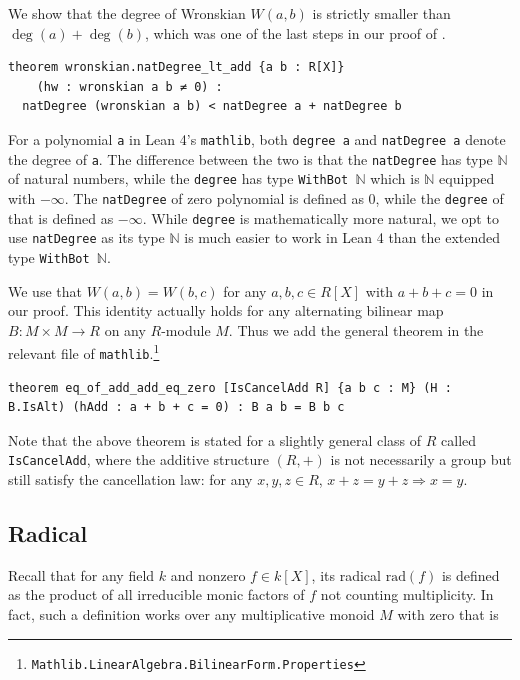 \documentclass[runningheads]{llncs}
\newcommand{\rad}{\mathrm{rad}}
\begin{document}
We show that the degree of Wronskian $W(a, b)$ is strictly smaller than $\deg(a) + \deg(b)$, which was one of the last steps in our proof of .

\begin{verbatim}
theorem wronskian.natDegree_lt_add {a b : R[X]}
    (hw : wronskian a b ≠ 0) :
  natDegree (wronskian a b) < natDegree a + natDegree b
\end{verbatim}


For a polynomial \texttt{a} in Lean 4's \texttt{mathlib}, both \texttt{degree a} and \texttt{natDegree a} denote the degree of \texttt{a}.
The difference between the two is that the \texttt{natDegree} has type $\mathbb{N}$ of natural numbers, while the \texttt{degree} has type \texttt{WithBot $\mathbb{N}$} which is $\mathbb{N}$ equipped with $-\infty$.
The \texttt{natDegree} of zero polynomial is defined as 0, while the \texttt{degree} of that is defined as $-\infty$.
While \texttt{degree} is mathematically more natural, we opt to use \texttt{natDegree} as its type $\mathbb{N}$ is much easier to work in Lean 4 than the extended type \texttt{WithBot $\mathbb{N}$}.

We use that $W(a, b) = W(b, c)$ for any $a, b, c \in R[X]$ with $a + b + c = 0$ in our proof.
This identity actually holds for any alternating bilinear map $B: M \times M \to R$ on any $R$-module $M$.
Thus we add the general theorem in the relevant file of \texttt{mathlib}.\footnote{\texttt{Mathlib.LinearAlgebra.BilinearForm.Properties}}

\begin{verbatim}
theorem eq_of_add_add_eq_zero [IsCancelAdd R] {a b c : M} (H : B.IsAlt) (hAdd : a + b + c = 0) : B a b = B b c
\end{verbatim}

Note that the above theorem is stated for a slightly general class of $R$ called \texttt{IsCancelAdd}, where the additive structure $(R, +)$ is not necessarily a group but still satisfy the cancellation law: for any $x, y, z \in R$, $x + z = y + z \Rightarrow x = y$.

\subsection{Radical}
\label{subsec:radical}

Recall that for any field $k$ and nonzero $f \in k[X]$, its radical $\rad (f)$ is defined as the product of all irreducible monic factors of $f$ not counting multiplicity. In fact, such a definition works over any multiplicative monoid $M$ with zero that is
\end{document}

